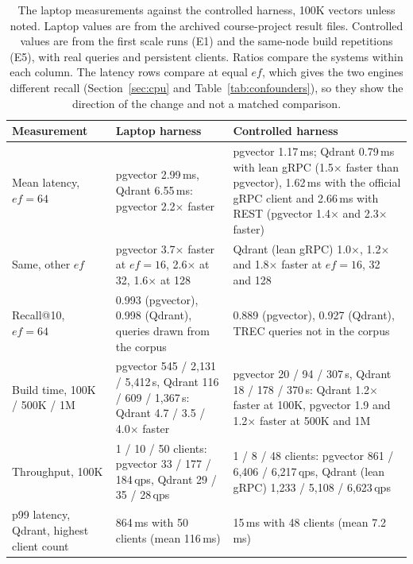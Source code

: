 \documentclass[preprint,12pt]{elsarticle}
\begin{document}
\begin{table}[t]
  \caption{The laptop measurements against the controlled harness, 100K vectors unless noted.
  Laptop values are from the archived course-project result files. Controlled values are from
  the first scale runs (E1) and the same-node build repetitions (E5), with real queries and
  persistent clients. Ratios compare the systems within each column. The latency rows compare
  at equal $ef$, which gives the two engines different recall (Section~\ref{sec:cpu} and
  Table~\ref{tab:confounders}), so they show the direction of the change and not a matched
  comparison.}
  \label{tab:laptop}
  \small
  \begin{tabular}{p{}p{}p{}}
    \toprule
    Measurement & Laptop harness & Controlled harness \\
    \midrule
    Mean latency, $ef=64$ &
      pgvector 2.99\,ms, Qdrant 6.55\,ms: pgvector 2.2$\times$ faster &
      pgvector 1.17\,ms; Qdrant 0.79\,ms with lean gRPC (1.5$\times$ faster than pgvector),
      1.62\,ms with the official gRPC client and 2.66\,ms with REST (pgvector 1.4$\times$ and
      2.3$\times$ faster) \\
    Same, other $ef$ &
      pgvector 3.7$\times$ faster at $ef=16$, 2.6$\times$ at 32, 1.6$\times$ at 128 &
      Qdrant (lean gRPC) 1.0$\times$, 1.2$\times$ and 1.8$\times$ faster at $ef=16$, 32 and 128 \\
    Recall@10, $ef=64$ &
      0.993 (pgvector), 0.998 (Qdrant), queries drawn from the corpus &
      0.889 (pgvector), 0.927 (Qdrant), TREC queries not in the corpus \\
    Build time, 100K / 500K / 1M &
      pgvector 545 / 2{,}131 / 5{,}412\,s, Qdrant 116 / 609 / 1{,}367\,s: Qdrant 4.7 / 3.5 /
      4.0$\times$ faster &
      pgvector 20 / 94 / 307\,s, Qdrant 18 / 178 / 370\,s: Qdrant 1.2$\times$ faster at 100K,
      pgvector 1.9 and 1.2$\times$ faster at 500K and 1M \\
    Throughput, 100K &
      1 / 10 / 50 clients: pgvector 33 / 177 / 184\,qps, Qdrant 29 / 35 / 28\,qps &
      1 / 8 / 48 clients: pgvector 861 / 6{,}406 / 6{,}217\,qps, Qdrant (lean gRPC) 1{,}233 /
      5{,}108 / 6{,}623\,qps \\
    p99 latency, Qdrant, highest client count &
      864\,ms with 50 clients (mean 116\,ms) &
      15\,ms with 48 clients (mean 7.2\,ms) \\
    \bottomrule
  \end{tabular}
\end{table}
\end{document}
